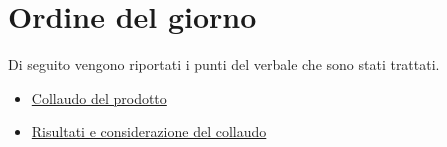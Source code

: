 \clearpage
\section{Ordine del giorno}
Di seguito vengono riportati i punti del verbale che sono stati trattati.
\begin{itemize}
	\item \hyperref[sec:collaudo]{Collaudo del prodotto}
	\item \hyperref[sec:feedback]{Risultati e considerazione del collaudo}
\end{itemize}